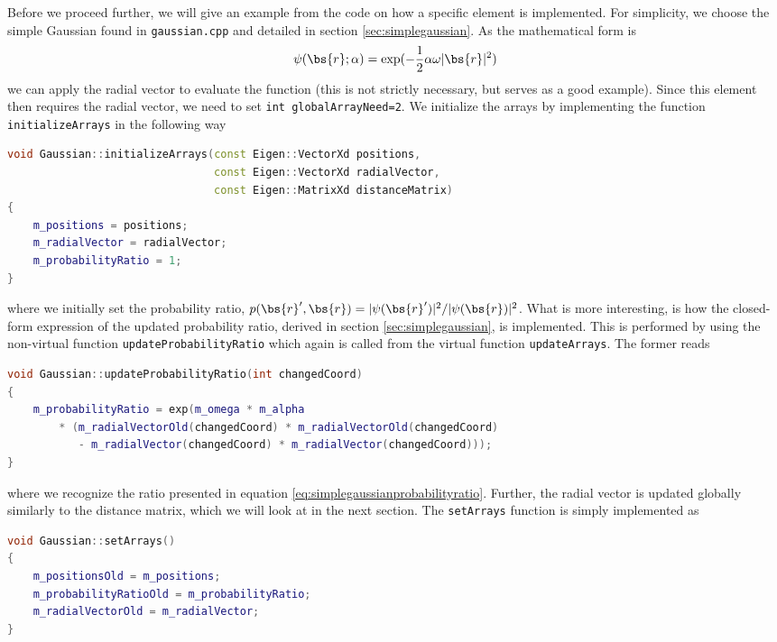 Before we proceed further, we will give an example from the code on how a specific element is implemented. For simplicity, we choose the simple Gaussian found in \lstinline{gaussian.cpp} and detailed in section \ref{sec:simplegaussian}. As the mathematical form is
\begin{equation}
\psi(\bs{r};\alpha)=\exp(-\frac{1}{2}\alpha\omega|\bs{r}|^2)
\end{equation}
we can apply the radial vector to evaluate the function (this is not strictly necessary, but serves as a good example). Since this element then requires the radial vector, we need to set \lstinline{int globalArrayNeed=2}. We initialize the arrays by implementing the function \lstinline{initializeArrays} in the following way
\begin{lstlisting}[language=c++,caption={Initialization of arrays, taken from \lstinline{gaussian.cpp}.}]
void Gaussian::initializeArrays(const Eigen::VectorXd positions,
								const Eigen::VectorXd radialVector,
								const Eigen::MatrixXd distanceMatrix)
{
	m_positions = positions;
	m_radialVector = radialVector;
	m_probabilityRatio = 1;
}
\end{lstlisting}
where we initially set the probability ratio, $p(\bs{r}',\bs{r})=|\psi(\bs{r}')|^2/|\psi(\bs{r})|^2$. What is more interesting, is how the closed-form expression of the updated probability ratio, derived in section \ref{sec:simplegaussian}, is implemented. This is performed by using the non-virtual function \lstinline{updateProbabilityRatio} which again is called from the virtual function \lstinline{updateArrays}. The former reads
\begin{lstlisting}[language=c++,caption={Update of probability ratio, taken from \lstinline{gaussian.cpp}.}]
void Gaussian::updateProbabilityRatio(int changedCoord)
{
	m_probabilityRatio = exp(m_omega * m_alpha
		* (m_radialVectorOld(changedCoord) * m_radialVectorOld(changedCoord)
		   - m_radialVector(changedCoord) * m_radialVector(changedCoord)));
}
\end{lstlisting}
where we recognize the ratio presented in equation \eqref{eq:simplegaussianprobabilityratio}. Further, the radial vector is updated globally similarly to the distance matrix, which we will look at in the next section. The \lstinline{setArrays} function is simply implemented as
\begin{lstlisting}[language=c++,caption={Replacing old arrays with the new arrays, taken from \lstinline{gaussian.cpp}.}]
void Gaussian::setArrays()
{
	m_positionsOld = m_positions;
	m_probabilityRatioOld = m_probabilityRatio;
	m_radialVectorOld = m_radialVector;
}
\end{lstlisting}
